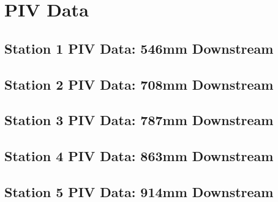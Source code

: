 
\chapter{PIV Data}

\section{Station 1 PIV Data: 546mm Downstream}












\section{Station 2 PIV Data: 708mm Downstream}












\section{Station 3 PIV Data: 787mm Downstream}












\section{Station 4 PIV Data: 863mm Downstream}












\section{Station 5 PIV Data: 914mm Downstream}












